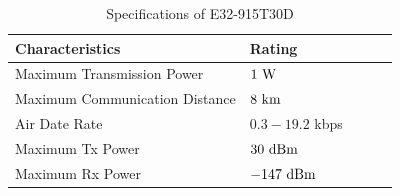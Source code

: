 \begin{table}[H]
\caption{Specifications of E32-915T30D} %
\centering %
\renewcommand{\arraystretch}{0.8}
\begin{tabular}{l l l l l} %
\hline
\textbf{Characteristics} & \textbf{Rating} \\ 
\hline %
Maximum Transmission Power & $1\ {\rm W}$ \\
Maximum Communication Distance & $8\ {\rm km}$ \\
Air Date Rate & $0.3-19.2$ kbps \\
Maximum Tx Power & $30\ {\rm dBm}$ \\
Maximum Rx Power & $-147\ {\rm dBm}$ \\
\hline
\end{tabular}
\label{table:03e32} %
\end{table}